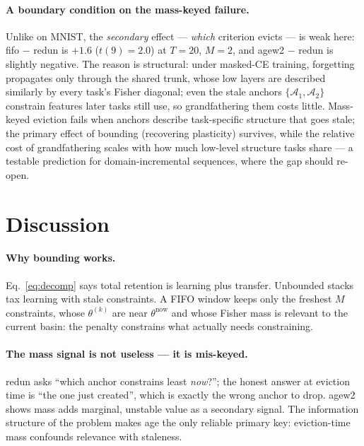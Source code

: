 \documentclass[review,12pt,number]{elsarticle}
\begin{document}
\paragraph{A boundary condition on the mass-keyed failure.}
Unlike on MNIST, the \emph{secondary} effect --- \emph{which}
criterion evicts --- is weak here: fifo $-$ redun is $+1.6$
($t(9){=}2.0$) at $T{=}20$, $M{=}2$, and agew2 $-$ redun is slightly
negative. The reason is structural: under masked-CE training,
forgetting propagates only through the shared trunk, whose low layers
are described similarly by every task's Fisher diagonal; even the
stale anchors $\{\mathcal{A}_1, \mathcal{A}_2\}$ constrain features
later tasks still use, so grandfathering them costs little.
Mass-keyed eviction fails when anchors describe task-specific
structure that goes stale; the primary effect of bounding (recovering
plasticity) survives, while the relative cost of grandfathering
scales with how much low-level structure tasks share --- a testable
prediction for domain-incremental sequences, where the gap should
re-open.

\section{Discussion}
\label{sec:discussion}

\paragraph{Why bounding works.}
Eq.~\ref{eq:decomp} says total retention is learning plus transfer.
Unbounded stacks tax learning with stale constraints. A FIFO window
keeps only the freshest $M$ constraints, whose $\theta^{(k)}$ are
near $\theta^{\text{now}}$ and whose Fisher mass is relevant to the
current basin: the penalty constrains what actually needs
constraining.

\paragraph{The mass signal is not useless --- it is mis-keyed.}
redun asks ``which anchor constrains least \emph{now}?''; the honest
answer at eviction time is ``the one just created'', which is exactly
the wrong anchor to drop. agew2 shows mass adds marginal, unstable
value as a secondary signal. The information structure of the
problem makes age the only reliable primary key: eviction-time mass
confounds relevance with staleness.
\end{document}
